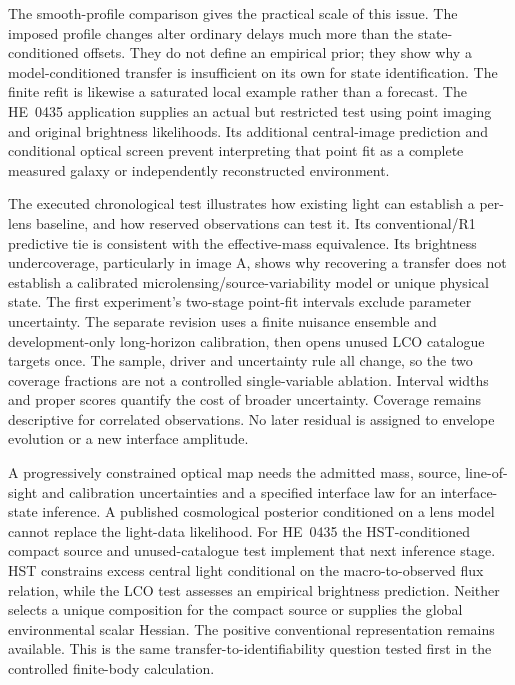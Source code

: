 The smooth-profile comparison gives the practical scale of this issue.
The imposed profile changes alter ordinary delays much more than the
state-conditioned offsets. They do not define an empirical prior; they
show why a model-conditioned transfer is insufficient on its own for
state identification. The finite refit is likewise a saturated local
example rather than a forecast. The HE~0435 application supplies an
actual but restricted test using point imaging and original brightness
likelihoods. Its additional central-image prediction and conditional
optical screen prevent interpreting that point fit as a complete measured
galaxy or independently reconstructed environment.

The executed chronological test illustrates how existing light can
establish a per-lens baseline, and how reserved observations can test it.
Its conventional/R1 predictive tie is consistent with the effective-mass
equivalence. Its brightness undercoverage, particularly in image A,
shows why recovering a transfer does not establish a calibrated
microlensing/source-variability model or unique physical state.
The first experiment's two-stage point-fit intervals exclude parameter
uncertainty. The separate revision uses a finite nuisance ensemble and
development-only long-horizon calibration, then opens unused LCO
catalogue targets once. The sample, driver and uncertainty rule all change, so
the two coverage fractions are not a controlled single-variable ablation.
Interval widths and proper scores quantify the cost of broader uncertainty.
Coverage remains descriptive for correlated observations. No later residual
is assigned to envelope evolution or a new interface amplitude.

A progressively constrained optical map needs the admitted mass,
source, line-of-sight and calibration uncertainties and a specified
interface law for an interface-state inference. A published cosmological
posterior conditioned on a lens model cannot replace the light-data
likelihood. For HE~0435 the HST-conditioned compact source and unused-catalogue
test implement that next inference stage. HST constrains excess central
light conditional on the macro-to-observed flux relation, while the LCO
test assesses an empirical brightness prediction. Neither selects a unique
composition for the compact source or supplies the global environmental
scalar Hessian. The positive conventional representation remains available.
This is the same transfer-to-identifiability question tested first in the
controlled finite-body calculation.

